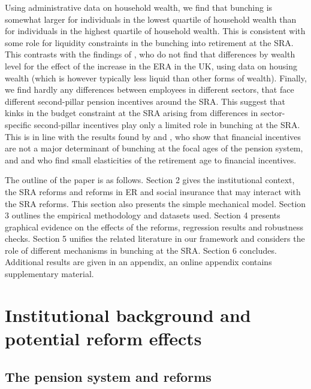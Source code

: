 \documentclass[12pt,a4paper]{article}
\begin{document}
Using administrative data on household wealth, we find that bunching is somewhat larger for individuals in the lowest quartile of household wealth than for individuals in the highest quartile of household wealth. This is consistent with some role for liquidity constraints in the bunching into retirement at the SRA. This contrasts with the findings of \cite{cribb2016signals}, who do not find that differences by wealth level for the effect of the increase in the ERA in the UK, using data on housing wealth (which is however typically less liquid than other forms of wealth).  
Finally, we find hardly any differences between employees in different sectors, that face different second-pillar pension incentives around the SRA. This suggest that kinks in the budget constraint at the SRA arising from differences in sector-specific second-pillar incentives play only a limited role in bunching at the SRA. This is in line with the results found by \cite{behaghel_framing_2012} and \cite{seibold2019reference}, who show that financial incentives are not a major determinant of bunching at the focal ages of the pension system, and \cite{Brown2013} and \cite{manoli2016nonparametric} who find small elasticities of the retirement age to financial incentives. 

The outline of the paper is as follows. Section 2 gives the institutional context, the SRA reforms and reforms in ER and social insurance that may interact with the SRA reforms. This section also presents the simple mechanical model. Section 3 outlines the empirical methodology and datasets used. Section 4 presents graphical evidence on the effects of the reforms, regression results and robustness checks. Section 5 unifies the related literature in our framework and considers the role of different mechanisms in bunching at the SRA. Section 6 concludes. Additional results are given in an appendix, an online appendix contains supplementary material.

\section{Institutional background and potential reform effects}\label{institutions}

\subsection{The pension system and reforms}
\end{document}
